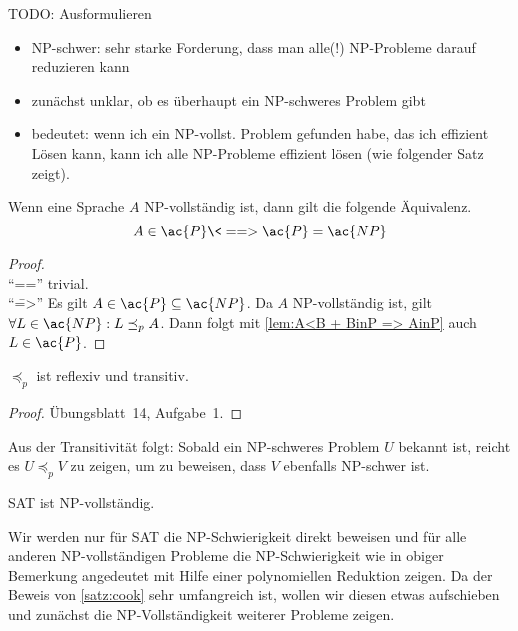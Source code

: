 {\color{red}
TODO: Ausformulieren
\begin{itemize}
 \item \ac{NP}-schwer: sehr starke Forderung, dass man alle(!) \ac{NP}-Probleme darauf reduzieren kann
 \item zunächst unklar, ob es überhaupt ein \ac{NP}-schweres Problem gibt
 \item bedeutet: wenn ich ein \ac{NP}-vollst. Problem gefunden habe, das ich effizient Lösen kann, kann ich alle \ac{NP}-Probleme effizient lösen (wie folgender Satz zeigt).
\end{itemize}
}
\begin{Satz}
	Wenn eine Sprache $A$ \ac{NP}-vollständig ist, dann gilt die folgende Äquivalenz.
	\[ A\in \ac{P} \<==> \ac{P} =\ac{NP} \qedhere \]
\end{Satz}
\begin{proof}\ \\
	"`\<=="' trivial.\\
	"`\==>"' Es gilt $A\in \ac{P} \subseteq \ac{NP}$. Da $A$ \ac{NP}-vollständig ist, gilt $\forall L\in \ac{NP}: L\preceq_p A$. Dann folgt mit \autoref{lem:A<B + BinP => AinP} auch $L\in \ac{P}$.
\end{proof}

\begin{lemma}[name={[$\preceq_p$ ist reflexiv und transitiv]}]
	$\preceq_p$ ist reflexiv und transitiv.
\end{lemma}
\begin{proof}
Übungsblatt~14, Aufgabe~1.
\end{proof}

\begin{Bem}
    Aus der Transitivität folgt:
	Sobald ein \ac{NP}-schweres Problem $U$ bekannt ist, reicht es $U\preceq_p V$ zu zeigen, um zu beweisen, dass $V$ ebenfalls \ac{NP}-schwer ist.
\end{Bem}

\begin{Satz}[Cook]\label{satz:cook}
	\ac{SAT} ist \ac{NP}-vollständig.
\end{Satz}
Wir werden nur für \ac{SAT} die \ac{NP}-Schwierigkeit direkt beweisen und für alle anderen \ac{NP}-vollständigen Probleme die \ac{NP}-Schwierigkeit wie in obiger Bemerkung angedeutet mit Hilfe einer polynomiellen Reduktion zeigen.
Da der Beweis von \autoref{satz:cook} sehr umfangreich ist, wollen wir diesen etwas aufschieben und zunächst die \ac{NP}-Vollständigkeit weiterer Probleme zeigen.


